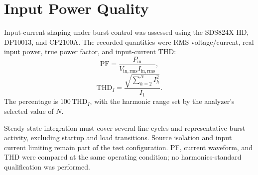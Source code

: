 \section{Input Power Quality}
\label{sec:method-pq}

Input-current shaping under burst control was assessed using the SDS824X HD,
DP10013, and CP2100A. The recorded quantities were RMS voltage/current, real
input power, true power factor, and input-current THD:
\begin{equation}
 \mathrm{PF}=\frac{P_{\mathrm{in}}}
 {V_{\mathrm{in,rms}}I_{\mathrm{in,rms}}},
 \label{eq:pf-method}
\end{equation}
\begin{equation}
 \mathrm{THD}_I=
 \frac{\sqrt{\sum_{h=2}^{N}I_h^2}}{I_1}.
 \label{eq:thd-method}
\end{equation}
The percentage is \(100\,\mathrm{THD}_I\), with the harmonic range set by the
analyzer's selected value of \(N\).

Steady-state integration must cover several line cycles and representative
burst activity, excluding startup and load transitions. Source isolation and
input current limiting remain part of the test configuration. PF, current
waveform, and THD were compared at the same operating condition; no
harmonics-standard qualification was performed.
